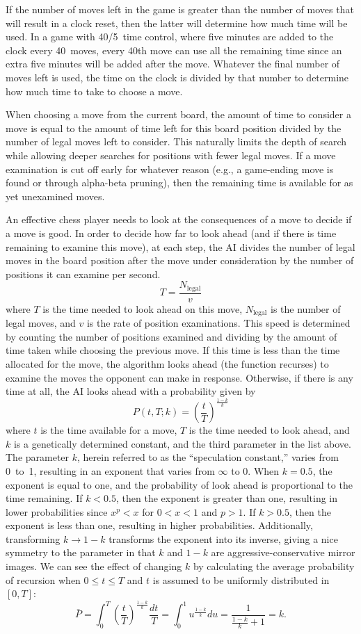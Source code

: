 \documentclass[letterpaper]{article}
\renewcommand{\_}{\allowbreak\textunderscore\allowbreak}
\begin{document}
If the number of moves left in the game is greater than the number of moves that will result in a clock reset, then the latter will determine how much time will be used. In a game with 40/5~time control, where five minutes are added to the clock every 40~moves, every 40th move can use all the remaining time since an extra five minutes will be added after the move. Whatever the final number of moves left is used, the time on the clock is divided by that number to determine how much time to take to choose a move.

When choosing a move from the current board, the amount of time to consider a move is equal to the amount of time left for this board position divided by the number of legal moves left to consider. This naturally limits the depth of search while allowing deeper searches for positions with fewer legal moves. If a move examination is cut off early for whatever reason (e.g., a game-ending move is found or through alpha-beta pruning), then the remaining time is available for as yet unexamined moves.

An effective chess player needs to look at the consequences of a move to decide if a move is good. In order to decide how far to look ahead (and if there is time remaining to examine this move), at each step, the AI divides the number of legal moves in the board position after the move under consideration by the number of positions it can examine per second.
\[
T = \frac{N_{\textrm{legal}}}{v}
\]
where \(T\) is the time needed to look ahead on this move, \(N_{\textrm{legal}}\) is the number of legal moves, and \(v\) is the rate of position examinations. This speed is determined by counting the number of positions examined and dividing by the amount of time taken while choosing the previous move. If this time is less than the time allocated for the move, the algorithm looks ahead (the function recurses) to examine the moves the opponent can make in response. Otherwise, if there is any time at all, the AI looks ahead with a probability given by
\[P(t, T; k) = \left(\frac{t}{T}\right)^\frac{1-k}{k}\]
where \(t\) is the time available for a move, \(T\) is the time needed to look ahead, and \(k\) is a genetically determined constant, and the third parameter in the list above. The parameter \(k\), herein referred to as the ``speculation constant,'' varies from 0~to~1, resulting in an exponent that varies from \(\infty\) to \(0\). When \(k=0.5\), the exponent is equal to one, and the probability of look ahead is proportional to the time remaining. If \(k < 0.5\), then the exponent is greater than one, resulting in lower probabilities since \(x^p < x\) for \(0 < x < 1\) and \(p > 1\).  If \(k > 0.5\), then the exponent is less than one, resulting in higher probabilities. Additionally, transforming \(k \to 1-k\) transforms the exponent into its inverse, giving a nice symmetry to the parameter in that \(k\) and \(1-k\) are aggressive-conservative mirror images. We can see the effect of changing \(k\) by calculating the average probability of recursion when \(0 \leq t \leq T\) and \(t\) is assumed to be uniformly distributed in \([0, T]\):
\[\bar{P} = \int_0^T \left(\frac{t}{T}\right)^{\frac{1-k}{k}}\frac{dt}{T} = \int_0^1 u^{\frac{1-k}{k}}du = \frac{1}{\frac{1-k}{k}+1} = k.\]
\end{document}
